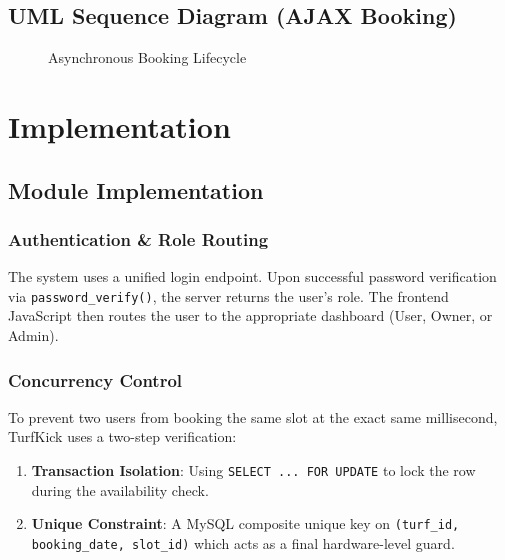 \documentclass[12pt,a4paper]{report}
\begin{document}
\section{UML Sequence Diagram (AJAX Booking)}
\begin{figure}[h]
    \centering
    \caption{Asynchronous Booking Lifecycle}
\end{figure}

\chapter{Implementation}
\section{Module Implementation}
\subsection{Authentication \& Role Routing}
The system uses a unified login endpoint. Upon successful password verification via \texttt{password\_verify()}, the server returns the user's role. The frontend JavaScript then routes the user to the appropriate dashboard (User, Owner, or Admin).

\subsection{Concurrency Control}
To prevent two users from booking the same slot at the exact same millisecond, TurfKick uses a two-step verification:
\begin{enumerate}
    \item \textbf{Transaction Isolation}: Using \texttt{SELECT ... FOR UPDATE} to lock the row during the availability check.
    \item \textbf{Unique Constraint}: A MySQL composite unique key on \texttt{(turf\_id, booking\_date, slot\_id)} which acts as a final hardware-level guard.
\end{enumerate}
\end{document}
